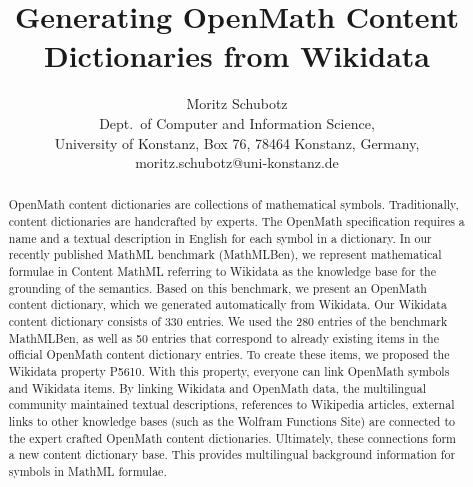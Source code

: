 \documentclass[a4paper]{article}
\title{Generating OpenMath Content Dictionaries from Wikidata}
\author{Moritz Schubotz \\
 Dept.~of Computer and Information Science,\\
 University of Konstanz, Box 76, 78464 Konstanz, Germany,\\
 moritz.schubotz@uni-konstanz.de
}
\begin{document}
\maketitle

\begin{abstract}
OpenMath content dictionaries are collections of mathematical symbols.
Traditionally, content dictionaries are handcrafted by experts.
The OpenMath specification requires a name and a textual description in English for each symbol in a dictionary.
In our recently published MathML benchmark (MathMLBen), we represent mathematical formulae in Content MathML referring to Wikidata as the knowledge base for the grounding of the semantics.
Based on this benchmark, we present an OpenMath content dictionary, which we generated automatically from Wikidata.
Our Wikidata content dictionary consists of 330 entries.
We used the 280 entries of the benchmark MathMLBen, as well as 50 entries that correspond to already existing items in the official OpenMath content dictionary entries.
To create these items, we proposed the Wikidata property P5610.
With this property, everyone can link OpenMath symbols and Wikidata items.
By linking Wikidata and OpenMath data, the multilingual community maintained textual descriptions, references to Wikipedia articles, external links to other knowledge bases (such as the Wolfram Functions Site) are connected to the
 expert crafted OpenMath content dictionaries.
Ultimately, these connections form a new content dictionary base.
This provides multilingual background information for symbols in MathML formulae.
\end{abstract}
\end{document}
